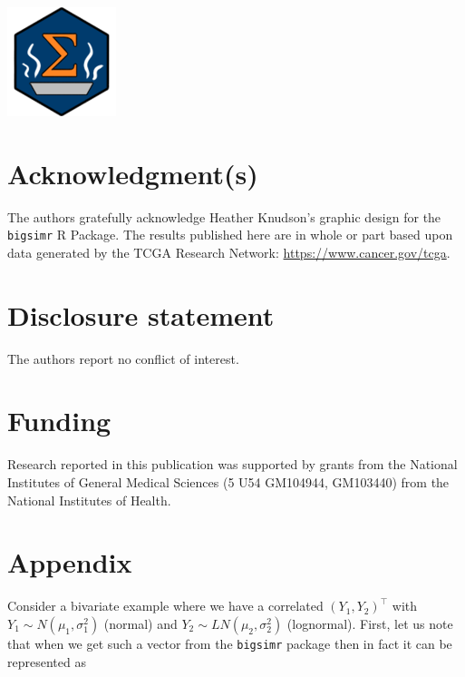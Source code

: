 \documentclass[
]{jss}
\begin{document}
\begin{CodeChunk}


\begin{center}\includegraphics[width=0.05\linewidth]{images/hex-bigsimr} \end{center}

\end{CodeChunk}

\hypertarget{acknowledgments}{%
\section*{Acknowledgment(s)}\label{acknowledgments}}

The authors gratefully acknowledge Heather Knudson's graphic design for
the \texttt{bigsimr} R Package. The results published here are in whole
or part based upon data generated by the TCGA Research Network:
\url{https://www.cancer.gov/tcga}.

\hypertarget{coi}{%
\section*{Disclosure statement}\label{coi}}

The authors report no conflict of interest.

\hypertarget{funding}{%
\section*{Funding}\label{funding}}

Research reported in this publication was supported by grants from the
National Institutes of General Medical Sciences (5 U54 GM104944,
GM103440) from the National Institutes of Health.

\newpage

\hypertarget{appendix}{%
\section*{Appendix}\label{appendix}}

\noindent Consider a bivariate example where we have a correlated
\((Y_1, Y_2)^\top\) with \(Y_1\sim N(\mu_1, \sigma_1^2)\) (normal) and
\(Y_2\sim LN(\mu_2, \sigma_2^2)\) (lognormal). First, let us note that
when we get such a vector from the \texttt{bigsimr} package then in fact
it can be represented as
\end{document}
